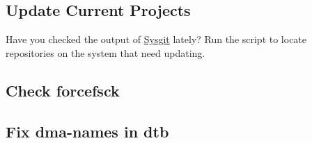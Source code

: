 \documentclass[format.tex]{subfiles}
\begin{document}
\subsection*{Update Current Projects}
Have you checked the output of
\href{https://github.com/AmateurECE/Sysgit}{Sysgit} lately? Run the script to
locate repositories on the system that need updating.

\subsection*{Check forcefsck}

\subsection*{Fix dma-names in dtb}

\end{document}
